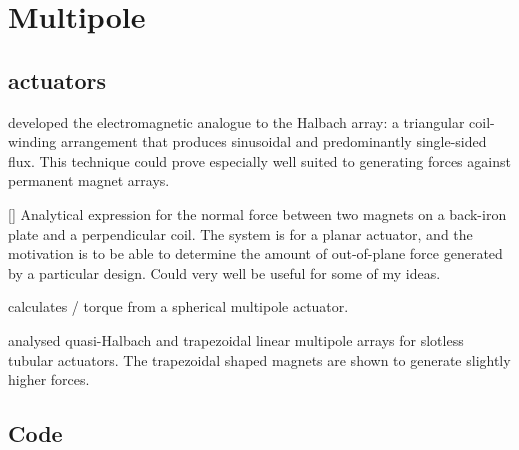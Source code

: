 
\chapter{Multipole}


\section{actuators}

\textcite{trumper1996} developed the electromagnetic analogue to the
Halbach array: a triangular coil-winding arrangement that produces
sinusoidal and predominantly single-sided flux. This technique could
prove especially well suited to generating forces against permanent
magnet arrays.


[\textcite{dasilveira2005}] Analytical expression for the normal force between two magnets on a back-iron plate and a perpendicular coil.
The system is for a planar actuator, and the motivation is to be able to determine the amount of out-of-plane force generated by a particular design.
Could very well be useful for some of my ideas.

\textcite{xia2008-ietm} calculates \threeD/ torque from a spherical multipole actuator.

\textcite{meessen2008-ietm} analysed quasi-Halbach and trapezoidal linear multipole arrays for slotless tubular actuators.
The trapezoidal shaped magnets are shown to generate slightly higher forces.

\section{Code}

